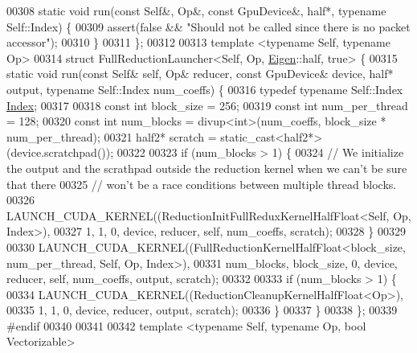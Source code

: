 \begin{DoxyCode}
00308   \textcolor{keyword}{static} \textcolor{keywordtype}{void} run(\textcolor{keyword}{const} Self&, Op&, \textcolor{keyword}{const} GpuDevice&, half*, \textcolor{keyword}{typename} Self::Index) \{
00309     assert(\textcolor{keyword}{false} && \textcolor{stringliteral}{"Should not be called since there is no packet accessor"});
00310   \}
00311 \};
00312 
00313 \textcolor{keyword}{template} <\textcolor{keyword}{typename} Self, \textcolor{keyword}{typename} Op>
00314 \textcolor{keyword}{struct }FullReductionLauncher<Self, Op, \hyperlink{namespace_eigen}{Eigen}::half, true> \{
00315   \textcolor{keyword}{static} \textcolor{keywordtype}{void} run(\textcolor{keyword}{const} Self& \textcolor{keyword}{self}, Op& reducer, \textcolor{keyword}{const} GpuDevice& device, half* output, \textcolor{keyword}{typename} 
      Self::Index num\_coeffs) \{
00316     \textcolor{keyword}{typedef} \textcolor{keyword}{typename} Self::Index \hyperlink{namespace_eigen_a62e77e0933482dafde8fe197d9a2cfde}{Index};
00317 
00318     \textcolor{keyword}{const} \textcolor{keywordtype}{int} block\_size = 256;
00319     \textcolor{keyword}{const} \textcolor{keywordtype}{int} num\_per\_thread = 128;
00320     \textcolor{keyword}{const} \textcolor{keywordtype}{int} num\_blocks = divup<int>(num\_coeffs, block\_size * num\_per\_thread);
00321     half2* scratch = \textcolor{keyword}{static\_cast<}half2*\textcolor{keyword}{>}(device.scratchpad());
00322 
00323     \textcolor{keywordflow}{if} (num\_blocks > 1) \{
00324       \textcolor{comment}{// We initialize the output and the scrathpad outside the reduction kernel when we can't be sure that
       there}
00325       \textcolor{comment}{// won't be a race conditions between multiple thread blocks.}
00326       LAUNCH\_CUDA\_KERNEL((ReductionInitFullReduxKernelHalfFloat<Self, Op, Index>),
00327                          1, 1, 0, device, reducer, \textcolor{keyword}{self}, num\_coeffs, scratch);
00328     \}
00329 
00330     LAUNCH\_CUDA\_KERNEL((FullReductionKernelHalfFloat<block\_size, num\_per\_thread, Self, Op, Index>),
00331                        num\_blocks, block\_size, 0, device, reducer, \textcolor{keyword}{self}, num\_coeffs, output, scratch);
00332 
00333     \textcolor{keywordflow}{if} (num\_blocks > 1) \{
00334       LAUNCH\_CUDA\_KERNEL((ReductionCleanupKernelHalfFloat<Op>),
00335                          1, 1, 0, device, reducer, output, scratch);
00336     \}
00337   \}
00338 \};
00339 \textcolor{preprocessor}{#endif}
00340 
00341 
00342 \textcolor{keyword}{template} <\textcolor{keyword}{typename} Self, \textcolor{keyword}{typename} Op, \textcolor{keywordtype}{bool} Vectorizable>

\end{DoxyCode}
